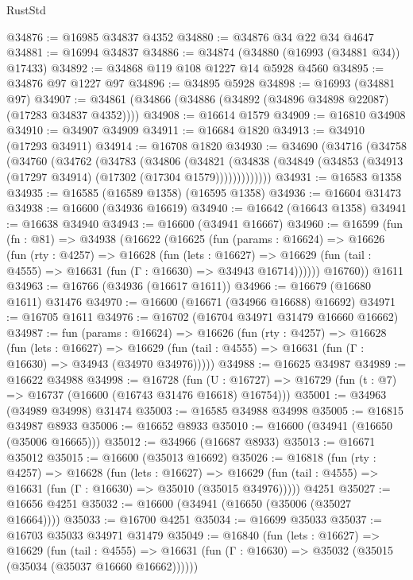 \begin{lexlean}{RustStd}
\begin{coremodule}
@34876 := @16985 @34837 @4352
@34880 := @34876 @34 @22 @34 @4647
@34881 := @16994 @34837
@34886 := @34874 (@34880 (@16993 (@34881 @34)) @17433)
@34892 := @34868 @119 @108 @1227 @14 @5928 @4560
@34895 := @34876 @97 @1227 @97
@34896 := @34895 @5928
@34898 := @16993 (@34881 @97)
@34907 := @34861 (@34866 (@34886 (@34892 (@34896 @34898 @22087) (@17283 @34837 @4352))))
@34908 := @16614 @1579
@34909 := @16810 @34908
@34910 := @34907 @34909
@34911 := @16684 @1820
@34913 := @34910 (@17293 @34911)
@34914 := @16708 @1820
@34930 := @34690
    (@34716
      (@34758
        (@34760
          (@34762
            (@34783
              (@34806
                (@34821
                  (@34838 (@34849 (@34853 (@34913 (@17297 @34914) (@17302 (@17304 @1579)))))))))))))
@34931 := @16583 @1358
@34935 := @16585 (@16589 @1358) (@16595 @1358)
@34936 := @16604 @31473
@34938 := @16600 (@34936 @16619)
@34940 := @16642 (@16643 @1358)
@34941 := @16638 @34940
@34943 := @16600 (@34941 @16667)
@34960 := @16599
    (fun (fn : @81) =>
    @34938
      (@16622
        (@16625
          (fun (params : @16624) =>
          @16626
            (fun (rty : @4257) =>
            @16628
              (fun (lets : @16627) =>
              @16629 (fun (tail : @4555) => @16631 (fun (Γ : @16630) => @34943 @16714))))))
        @16760))
    @1611
@34963 := @16766 (@34936 (@16617 @1611))
@34966 := @16679 (@16680 @1611) @31476
@34970 := @16600 (@16671 (@34966 @16688) @16692)
@34971 := @16705 @1611
@34976 := @16702 (@16704 @34971 @31479 @16660 @16662)
@34987 := fun (params : @16624) =>
  @16626
    (fun (rty : @4257) =>
    @16628
      (fun (lets : @16627) =>
      @16629 (fun (tail : @4555) => @16631 (fun (Γ : @16630) => @34943 (@34970 @34976)))))
@34988 := @16625 @34987
@34989 := @16622 @34988
@34998 := @16728
    (fun (U : @16727) => @16729 (fun (t : @7) => @16737 (@16600 (@16743 @31476 @16618) @16754)))
@35001 := @34963 (@34989 @34998) @31474
@35003 := @16585 @34988 @34998
@35005 := @16815 @34987 @8933
@35006 := @16652 @8933
@35010 := @16600 (@34941 (@16650 (@35006 @16665)))
@35012 := @34966 (@16687 @8933)
@35013 := @16671 @35012
@35015 := @16600 (@35013 @16692)
@35026 := @16818
    (fun (rty : @4257) =>
    @16628
      (fun (lets : @16627) =>
      @16629 (fun (tail : @4555) => @16631 (fun (Γ : @16630) => @35010 (@35015 @34976)))))
    @4251
@35027 := @16656 @4251
@35032 := @16600 (@34941 (@16650 (@35006 (@35027 @16664))))
@35033 := @16700 @4251
@35034 := @16699 @35033
@35037 := @16703 @35033 @34971 @31479
@35049 := @16840
    (fun (lets : @16627) =>
    @16629
      (fun (tail : @4555) =>
      @16631 (fun (Γ : @16630) => @35032 (@35015 (@35034 (@35037 @16660 @16662))))))

\end{coremodule}
\end{lexlean}

